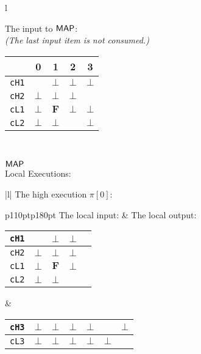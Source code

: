 \documentclass[10pt,a4paper,oneside]{article}
\def\VFALSE{\ensuremath{\textbf{F}}}
\def\NIL{\ensuremath{\bot}}
\def\sanserif#1{\ensuremath{\sf #1}}
\def\MAP{\ensuremath{\sanserif{MAP}}}
\def\Prog{\ensuremath{\pi}}
\def\Progl#1{\ensuremath{\Prog[#1]}}
\def\linecode#1{{\texttt{#1}}}
\begin{document}
\begin{figure}[!t]
\begin{lrbox}{\mylistingbox}\begin{tabular}{l}
\begin{minipage}{183pt}
The input to \MAP:\\
\emph{(The last input item is not consumed.)} 
\begin{tabular}{|c|c|c|c|c|}
	\hline
	\backslashbox{Channel}{Time} & 0 & 1 & 2 & 3 \\
    \hline
	\linecode{cH1} &  & \NIL & \NIL & \NIL\\
	\hline
	\linecode{cH2} & \NIL & \NIL & \NIL &  \\
	\hline
	\linecode{cL1} & \NIL & \VFALSE & \NIL & \NIL\\
	\hline
	\linecode{cL2} & \NIL & \NIL &  & \NIL\\
	\hline 
\end{tabular} \\
\end{minipage}  \MAP \\
Local Executions: \\
\begin{tabular}{|l|}
\hline
The high execution \Progl{0}:\\
\begin{tabular}{p{110pt}p{180pt}}
The local input: & The local output:\\
\begin{tabular}{|c|c|c|c|c|}
	\hline
	\linecode{cH1} &  & \NIL & \NIL \\
	\hline
	\linecode{cH2} & \NIL & \NIL & \NIL \\
	\hline
	\linecode{cL1} & \NIL & \VFALSE & \NIL \\
	\hline
	\linecode{cL2} & \NIL & \NIL &  \\
	\hline
\end{tabular} & 
\begin{minipage}{180pt}
\begin{tabular}{|c|c|c|c|c|>{\centering\arraybackslash}p{25pt}|>{\centering\arraybackslash}p{25pt}|}
	\hline	
	\linecode{cH3} & \NIL & \NIL & \NIL & \NIL &  & \NIL\\
	\hline
	\linecode{cL3} & \NIL & \NIL & \NIL & \NIL &  \NIL & \\
	\hline 	
\end{tabular}
\vspace{25pt}
\end{minipage} \\


\end{tabular}
\end{tabular}
\end{tabular}
\end{lrbox}
\end{figure}
\end{document}
